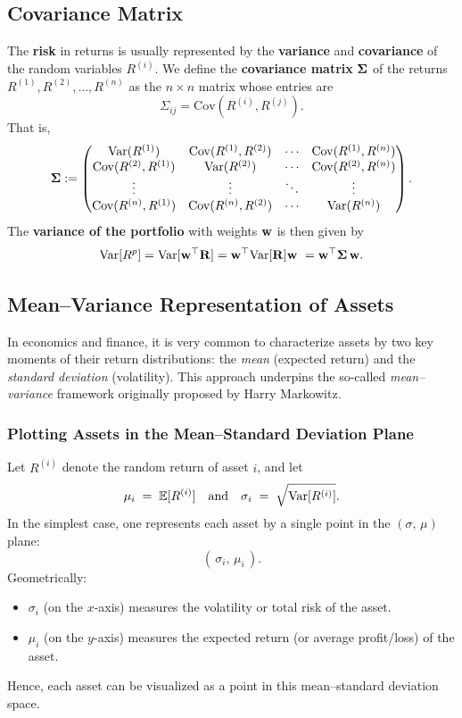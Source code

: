 \subsection{Covariance Matrix}
The \textbf{risk} in returns is usually represented by the \textbf{variance} and \textbf{covariance} of the random variables $R^{(i)}$. We define the \textbf{covariance matrix} $\mathbf  \Sigma$ of the returns $R^{(1)}, R^{(2)}, \ldots, R^{(n)}$ as the $n \times n$ matrix whose entries are
$$
\Sigma_{ij} = \mathrm{Cov}(R^{(i)}, R^{(j)}).
$$
That is,
$$
\mathbf  \Sigma := \begin{pmatrix}
\mathrm{Var}(R^{(1)}) & \mathrm{Cov}(R^{(1)}, R^{(2)}) & \cdots & \mathrm{Cov}(R^{(1)}, R^{(n)}) \\
\mathrm{Cov}(R^{(2)}, R^{(1)}) & \mathrm{Var}(R^{(2)}) & \cdots & \mathrm{Cov}(R^{(2)}, R^{(n)}) \\
\vdots & \vdots & \ddots & \vdots \\
\mathrm{Cov}(R^{(n)}, R^{(1)}) & \mathrm{Cov}(R^{(n)}, R^{(2)}) & \cdots & \mathrm{Var}(R^{(n)})
\end{pmatrix}.
$$
The \textbf{variance of the portfolio} with weights $\mathbf w$ is then given by
$$
\mathrm{Var}[R^p]=
\mathrm{Var}[\mathbf w^\top \mathbf R]=
\mathbf w^\top\mathrm{Var}[\mathbf R] \mathbf w\
= \mathbf w^\top \mathbf \Sigma \, \mathbf w.
$$

\subsection{Mean--Variance Representation of Assets}
In economics and finance, it is very common to characterize assets by two key moments of their return distributions: the \emph{mean} (expected return) and the \emph{standard deviation} (volatility). This approach underpins the so-called \emph{mean--variance} framework originally proposed by Harry Markowitz. 

\subsubsection{Plotting Assets in the Mean--Standard Deviation Plane}
Let $R^{(i)}$ denote the random return of asset $i$, and let
\[
\mu_i \;=\;\mathbb{E}[R^{(i)}]
\quad\text{and}\quad
\sigma_i \;=\;\sqrt{\mathrm{Var}[R^{(i)}]}.
\]
In the simplest case, one represents each asset by a single point in the $(\sigma,\,\mu)$ plane:
\[
(\,\sigma_i,\,\mu_i\,).
\]
Geometrically:
\begin{itemize}
    \item \(\sigma_i\) (on the $x$-axis) measures the volatility or total risk of the asset.
    \item \(\mu_i\) (on the $y$-axis) measures the expected return (or average profit/loss) of the asset.
\end{itemize}
Hence, each asset can be visualized as a point in this mean--standard deviation space. 

